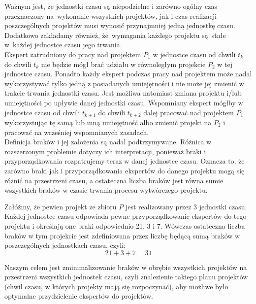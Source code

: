 \documentclass[12pt,a4paper]{article}
\theoremstyle{definition}
\begin{document}
\vspace{0.5em}
\noindent
Ważnym jest, że jednostki czasu są niepodzielne i zarówno ogólny czas przeznaczony na~wykonanie wszystkich projektów, jak i czas realizacji poszczególnych projektów musi wynosić przynajmniej jedną jednostkę czasu. Dodatkowo zakładamy również, że~wymagania każdego projektu są~stałe w~każdej jednostce czasu jego trwania.\\

\noindent
Ekspert zatrudniony do pracy nad projektem $P_1$ w jednostce czasu od chwili $t_k$ do chwili $t_{k}$ nie będzie mógł brać udziału w równoległym projekcie $P_2$ w tej jednostce czasu. Ponadto każdy ekspert podczas pracy nad projektem może nadal wykorzystywać tylko jedną z posiadanych umiejętności i nie może jej zmienić w trakcie trwania jednostki czasu. Jest możliwa natomiast zmiana projektu i/lub umiejętności po upływie danej jednostki czasu. Wspomniany ekspert mógłby w jednostce czasu od chwili $t_{k+1}$ do chwili $t_{k+2}$ dalej pracować nad projektem $P_1$ wykorzystując tę samą lub inną umiejętność albo zmienić projekt na $P_2$ i pracować na wcześniej wspomnianych zasadach.\\

\noindent
Definicja braków i jej założenia są nadal podtrzymywane. Różnica w rozszerzonym problemie dotyczy ich interpretacji, ponieważ braki i przyporządkowania rozpatrujemy teraz w danej jednostce czasu. Oznacza to, że zarówno braki jak i przyporządkowania ekspertów do danego projektu mogą się różnić na przestrzeni czasu, a ostateczna liczba braków jest równa sumie wszystkich braków w czasie trwania procesu wytwórczego projektu.\\

\begin{tcolorbox}[title=Przykład --- obliczanie ostatecznej liczby braków]
Załóżmy, że pewien projekt ze zbioru $P$ jest realizowany przez 3 jednostki czasu. Każdej jednostce czasu odpowiada pewne przyporządkowanie ekspertów do tego projektu i określają one braki odpowiednio 21, 3 i 7. Wówczas ostateczna liczba braków w tym projekcie jest zdefiniowana przez liczbę będącą sumą braków w poszczególnych jednostkach czasu, czyli:
$$21 + 3 + 7 = 31$$
\end{tcolorbox}

\vspace{0.5em}
\noindent
Naszym celem jest zminimalizowanie braków w obrębie wszystkich projektów na przestrzeni wszystkich jednostek czasu, czyli znalezienie takiego planu projektów (chwil czasu, w których projekty mają się rozpoczynać), aby możliwe było optymalne przydzielenie ekspertów do projektów.
\end{document}
